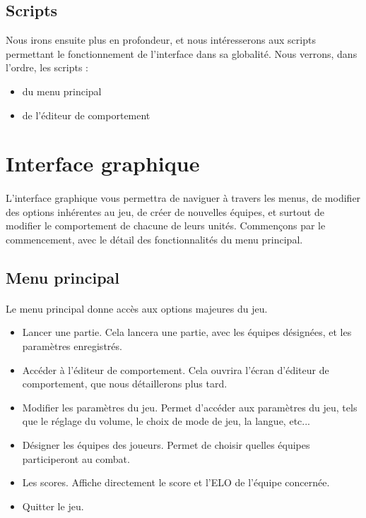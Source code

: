 \documentclass{article}
\begin{document}
\subsection{Scripts}
\label{Scripts}
Nous irons ensuite plus en profondeur, et nous intéresserons aux scripts permettant le fonctionnement de l'interface dans sa globalité.
Nous verrons, dans l'ordre, les scripts :
\begin{itemize}
\item du menu principal
\item de l'éditeur de comportement
\end{itemize}
 

\section{Interface graphique}

\paragraph{}
L'interface graphique vous permettra de naviguer à travers les menus, de modifier des options inhérentes au jeu, de créer de nouvelles équipes, et surtout de modifier le comportement de chacune de leurs unités.
Commençons par le commencement, avec le détail des fonctionnalités du menu principal.

\subsection{Menu principal}

\paragraph{}
Le menu principal donne accès aux options majeures du jeu.
\begin{itemize}
	\item Lancer une partie. Cela lancera une partie, avec les équipes désignées, et les paramètres enregistrés.
	\item Accéder à l'éditeur de comportement. Cela ouvrira l'écran d'éditeur de comportement, que nous détaillerons plus tard.
	\item Modifier les paramètres du jeu. Permet d'accéder aux paramètres du jeu, tels que le réglage du volume, le choix de mode de jeu, la langue, etc...
	\item Désigner les équipes des joueurs. Permet de choisir quelles équipes participeront au combat.
	\item Les scores. Affiche directement le score et l'ELO de l'équipe concernée.
	\item Quitter le jeu. 
\end{itemize}
\end{document}

